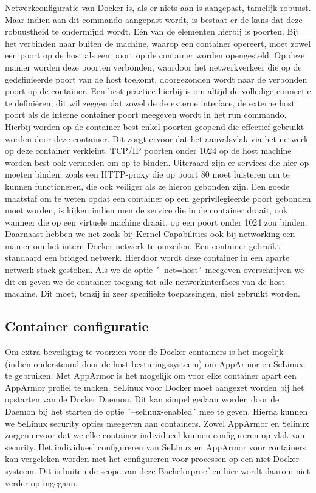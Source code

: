 Netwerkconfiguratie van Docker is, als er niets aan is aangepast, tamelijk robuust. Maar indien aan dit commando aangepast wordt, is bestaat er de kans dat deze robuustheid te ondermijnd wordt. Eén van de elementen hierbij is poorten. Bij het verbinden naar buiten de machine, waarop een container opereert, moet zowel een poort op de host als een poort op de container worden opengesteld. Op deze manier worden deze poorten verbonden, waardoor het netwerkverkeer die op de gedefinieerde poort van de host toekomt, doorgezonden wordt naar de verbonden poort op de container. Een best practice hierbij is om altijd de volledige connectie te definiëren, dit wil zeggen dat zowel de de externe interface, de externe host poort als de interne container poort meegeven wordt in het run commando. Hierbij worden op de container best enkel poorten geopend die effectief gebruikt worden door deze container. Dit zorgt ervoor dat het aanvalsvlak via het netwerk op deze container verkleint. TCP/IP poorten onder 1024 op de host machine worden best ook vermeden om op te binden. Uiteraard zijn er services die hier op moeten binden, zoals een HTTP-proxy die op poort 80 moet luisteren om te kunnen functioneren, die ook veiliger als ze hierop gebonden zijn. Een goede maatstaf om te weten opdat een container op een geprivilegieerde poort gebonden moet worden, is kijken indien men de service die in de container draait, ook wanneer die op een virtuele machine draait, op een poort onder 1024 zou binden. Daarnaast hebben we net zoals bij Kernel Capabilities ook bij networking een manier om het intern Docker netwerk te omzeilen. Een container gebruikt standaard een bridged netwerk. Hierdoor wordt deze container in een aparte netwerk stack gestoken. Als we de optie ´--net=host´ meegeven overschrijven we dit en geven we de container toegang tot alle netwerkinterfaces van de host machine. Dit moet, tenzij in zeer specifieke toepassingen, niet gebruikt worden.


\subsection{Container configuratie}

Om extra beveiliging te voorzien voor de Docker containers is het mogelijk (indien ondersteund door de host besturingssysteem) om AppArmor en SeLinux te gebruiken. Met AppArmor is het mogelijk om voor elke container apart een AppArmor profiel te maken. SeLinux voor Docker moet aangezet worden bij het opstarten van de Docker Daemon. Dit kan simpel gedaan worden door de Daemon bij het starten de optie ´--selinux-enabled´ mee te geven. Hierna kunnen we SeLinux security opties meegeven aan containers. Zowel AppArmor en Selinux zorgen ervoor dat we elke container individueel kunnen configureren op vlak van security. Het individueel configureren van SeLinux en AppArmor voor containers kan vergeleken worden met het configureren voor processen op een niet-Docker systeem. Dit is buiten de scope van deze Bachelorproef en hier wordt daarom niet verder op ingegaan.

